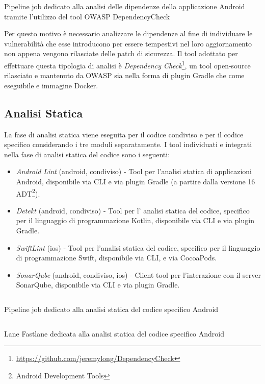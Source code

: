\begin{listing}[H]
\inputminted{yaml}{code/4-depcheckjob}
\caption{Pipeline job dedicato alla analisi delle dipendenze della applicazione Android tramite l'utilizzo del tool OWASP DependencyCheck}
\end{listing}

Per questo motivo è necessario analizzare le dipendenze al fine di individuare le vulnerabilità che esse introducono per essere tempestivi nel loro aggiornamento non appena vengono rilasciate delle patch di sicurezza. Il tool adottato per effettuare questa tipologia di analisi è \textit{Dependency Check}\footnote{\url{https://github.com/jeremylong/DependencyCheck}}, un tool open-source rilasciato e mantenuto da OWASP sia nella forma di plugin Gradle che come eseguibile e immagine Docker.

\subsection{Analisi Statica}
La fase di analisi statica viene eseguita per il codice condiviso e per il codice specifico considerando i tre moduli separatamente. I tool individuati e integrati nella fase di analisi statica del codice sono i seguenti:
\begin{itemize}
    \item \textit{Android Lint} (android, condiviso) - Tool per l'analisi statica di applicazioni Android, disponibile via CLI e via plugin Gradle (a partire dalla versione 16 ADT\footnote{Android Development Tools}).
    \item \textit{Detekt} (android, condiviso) - Tool per l' analisi statica del codice, specifico per il linguaggio di programmazione Kotlin, disponibile via CLI e via plugin Gradle.
    \item \textit{SwiftLint} (ios) - Tool per l'analisi statica del codice, specifico per il linguaggio di programmazione Swift, disponibile via CLI, e via CocoaPods.
    \item \textit{SonarQube} (android, condiviso, ios) - Client tool per l'interazione con il server SonarQube, disponibile via CLI e via plugin Gradle.
\end{itemize}

\begin{listing}[H]
\inputminted{yaml}{code/4-sastjob}
\caption{Pipeline job dedicato alla analisi statica del codice specifico Android}
\end{listing}

\begin{listing}[H]
\inputminted{ruby}{code/4-sastfastlane}
\caption{Lane Fastlane dedicata alla analisi statica del codice specifico Android}
\end{listing}

